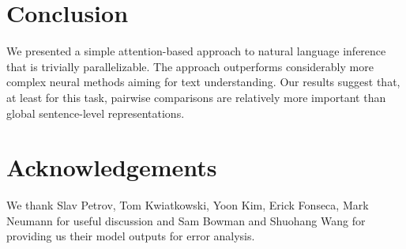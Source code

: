 \documentclass[11pt,letterpaper]{article}
\begin{document}
\section{Conclusion}
\vspace{-0.1cm}

We presented a simple attention-based approach to natural language inference that is trivially parallelizable.
The approach outperforms considerably more complex neural methods aiming for text understanding.
Our results suggest that, at least for this task, pairwise comparisons are relatively more important than global sentence-level representations.


\section*{Acknowledgements}
We thank Slav Petrov, Tom Kwiatkowski, Yoon Kim, Erick Fonseca, Mark Neumann for useful discussion and Sam Bowman and Shuohang Wang for providing us their model outputs for error analysis.


\end{document}
